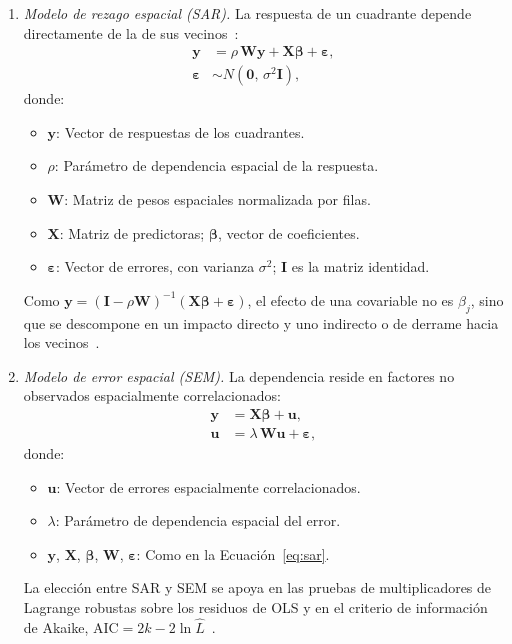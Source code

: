 \begin{enumerate}
    \item \textit{Modelo de rezago espacial (SAR).} La respuesta de un cuadrante depende directamente de la de sus vecinos~\cite{anselin1988,lesage2009}:
    \begin{equation}
        \begin{aligned}
        \mathbf{y} &= \rho\,\mathbf{W}\mathbf{y} + \mathbf{X}\boldsymbol{\beta} + \boldsymbol{\varepsilon}, \\
        \boldsymbol{\varepsilon} &\sim N\left(\mathbf{0},\, \sigma^{2}\mathbf{I}\right),
        \end{aligned}
        \label{eq:sar}
    \end{equation}
    donde:
    \begin{itemize}
        \item $\mathbf{y}$: Vector de respuestas de los cuadrantes.
        \item $\rho$: Parámetro de dependencia espacial de la respuesta.
        \item $\mathbf{W}$: Matriz de pesos espaciales normalizada por filas.
        \item $\mathbf{X}$: Matriz de predictoras; $\boldsymbol{\beta}$, vector de coeficientes.
        \item $\boldsymbol{\varepsilon}$: Vector de errores, con varianza $\sigma^{2}$; $\mathbf{I}$ es la matriz identidad.
    \end{itemize}
    Como $\mathbf{y}=(\mathbf{I}-\rho\mathbf{W})^{-1}(\mathbf{X}\boldsymbol{\beta}+\boldsymbol{\varepsilon})$, el efecto de una covariable no es $\beta_j$, sino que se descompone en un impacto directo y uno indirecto o de derrame hacia los vecinos~\cite{lesage2009}.

    \item \textit{Modelo de error espacial (SEM).} La dependencia reside en factores no observados espacialmente correlacionados:
    \begin{equation}
        \begin{aligned}
        \mathbf{y} &= \mathbf{X}\boldsymbol{\beta} + \mathbf{u}, \\
        \mathbf{u} &= \lambda\,\mathbf{W}\mathbf{u} + \boldsymbol{\varepsilon},
        \end{aligned}
        \label{eq:sem}
    \end{equation}
    donde:
    \begin{itemize}
        \item $\mathbf{u}$: Vector de errores espacialmente correlacionados.
        \item $\lambda$: Parámetro de dependencia espacial del error.
        \item $\mathbf{y}$, $\mathbf{X}$, $\boldsymbol{\beta}$, $\mathbf{W}$, $\boldsymbol{\varepsilon}$: Como en la Ecuación~\eqref{eq:sar}.
    \end{itemize}
    La elección entre SAR y SEM se apoya en las pruebas de multiplicadores de Lagrange robustas sobre los residuos de OLS y en el criterio de información de Akaike, $\mathrm{AIC}=2k-2\ln\hat{L}$~\cite{anselin1988}.


\end{enumerate}
